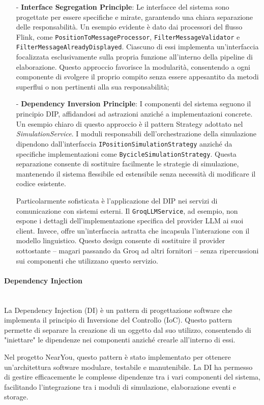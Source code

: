 \documentclass[10pt]{article}
\newcommand{\myparagraph}[1]{\paragraph{#1}\mbox{}\\}
\begin{document}
\begin{itemize}
        \item[-] \textbf{Interface Segregation Principle}: Le interfacce del sistema sono progettate per essere specifiche e mirate, garantendo una chiara separazione delle responsabilità. Un esempio evidente è dato dai processori del flusso Flink, come \texttt{PositionToMessageProcessor}, \texttt{FilterMessageValidator} e \texttt{FilterMessageAlreadyDisplayed}. Ciascuno di essi implementa un'interfaccia focalizzata esclusivamente sulla propria funzione all'interno della pipeline di elaborazione. Questo approccio favorisce la modularità, consentendo a ogni componente di svolgere il proprio compito senza essere appesantito da metodi superflui o non pertinenti alla sua responsabilità;

        \item[-] \textbf{Dependency Inversion Principle}: I componenti del sistema seguono il principio DIP, affidandosi ad astrazioni anziché a implementazioni concrete. Un esempio chiaro di questo approccio è il pattern Strategy adottato nel \textit{SimulationService}. I moduli responsabili dell'orchestrazione della simulazione dipendono dall'interfaccia \texttt{IPositionSimulationStrategy} anziché da specifiche implementazioni come \texttt{BycicleSimulationStrategy}. Questa separazione consente di sostituire facilmente le strategie di simulazione, mantenendo il sistema flessibile ed estensibile senza necessità di modificare il codice esistente.

        Particolarmente sofisticata è l'applicazione del DIP nei servizi di comunicazione con sistemi esterni. Il \texttt{GroqLLMService}, ad esempio, non espone i dettagli dell'implementazione specifica del provider LLM ai suoi client. Invece, offre un'interfaccia astratta che incapsula l'interazione con il modello linguistico. Questo design consente di sostituire il provider sottostante – magari passando da Groq ad altri fornitori – senza ripercussioni sui componenti che utilizzano questo servizio.
    \end{itemize}

    \myparagraph{Dependency Injection}

    La Dependency Injection (DI) è un pattern di progettazione software che implementa il principio di Inversione del Controllo (IoC). Questo pattern permette di separare la creazione di un oggetto dal suo utilizzo, consentendo di "iniettare" le dipendenze nei componenti anziché crearle all'interno di essi.
    
    Nel progetto NearYou, questo pattern è stato implementato per ottenere un'architettura software modulare, testabile e manutenibile. La DI ha permesso di gestire efficacemente le complesse dipendenze tra i vari componenti del sistema, facilitando l'integrazione tra i moduli di simulazione, elaborazione eventi e storage.
    
\end{document}
